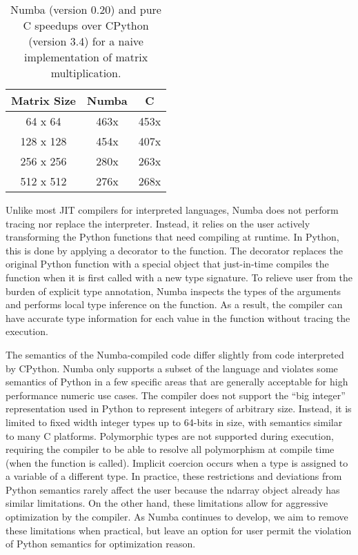 \documentclass{acm_proc_article-sp}
\begin{document}
\begin{table}
\centering
\caption{Numba (version 0.20) and pure C speedups over CPython (version 3.4) for a naive implementation of matrix multiplication.}
\label{table:speedup}
\begin{tabular}{|c|c|c|} \hline
\textbf{Matrix Size} & \textbf{Numba} & \textbf{C}\\ \hline
64 x 64 & 463x & 453x \\ \hline
128 x 128 & 454x & 407x \\ \hline
256 x 256 & 280x & 263x \\ \hline
512 x 512 & 276x & 268x \\ \hline
\end{tabular}
\end{table}



Unlike most JIT compilers for interpreted languages, Numba does not
perform tracing nor replace the interpreter.  Instead, it relies on
the user actively transforming the Python functions that need
compiling at runtime.  In Python, this is done by applying a decorator
to the function.  The decorator replaces the original Python function
with a special object that just-in-time compiles the function when it
is first called with a new type signature.  To relieve user from the
burden of explicit type annotation, Numba inspects the types of the
arguments and performs local type inference on the function.  As a
result, the compiler can have accurate type information for each value
in the function without tracing the execution.

The semantics of the Numba-compiled code differ slightly from code
interpreted by CPython. Numba only supports a subset of the language
and violates some semantics of Python in a few specific areas that are
generally acceptable for high performance numeric use cases.  The
compiler does not support the ``big integer'' representation used in
Python to represent integers of arbitrary size.  Instead, it is
limited to fixed width integer types up to 64-bits in size, with
semantics similar to many C platforms.  Polymorphic types are
not supported during execution, requiring the compiler to be able to
resolve all polymorphism at compile time (when the function is
called).  Implicit coercion occurs when a type is assigned to a
variable of a different type. In practice, these restrictions and
deviations from Python semantics rarely affect the user because the
ndarray object already has similar limitations. On the other hand,
these limitations allow for aggressive optimization by the compiler.
As Numba continues to develop, we aim to remove these limitations when
practical, but leave an option for user permit the violation of Python
semantics for optimization reason.
\end{document}

